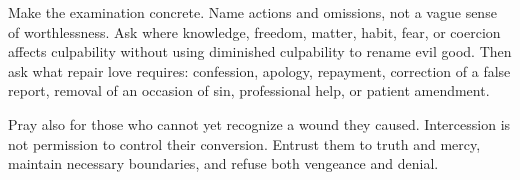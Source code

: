 Make the examination concrete. Name actions and omissions, not a vague sense of worthlessness. Ask where knowledge, freedom, matter, habit, fear, or coercion affects culpability without using diminished culpability to rename evil good. Then ask what repair love requires: confession, apology, repayment, correction of a false report, removal of an occasion of sin, professional help, or patient amendment.

Pray also for those who cannot yet recognize a wound they caused. Intercession is not permission to control their conversion. Entrust them to truth and mercy, maintain necessary boundaries, and refuse both vengeance and denial.




